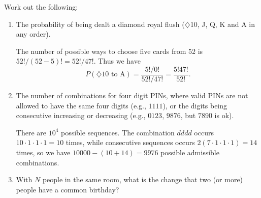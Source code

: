 \documentclass[letter-paper]{tufte-book}
\newenvironment{example}[1][Example]{\begin{trivlist}
\item[\hskip \labelsep {\bfseries #1}]}{\end{trivlist}}
\begin{document}
\begin{example}
  Work out the following:
  \begin{enumerate}
    \item The probability of being dealt a diamond royal flush
    ($\diamondsuit$10, J, Q, K and A in any order).
    
    The number of possible ways to choose five cards from 52 is
    $52!/(52-5)!=52!/47!$. Thus we have
    \begin{equation*}
      P(\diamondsuit\mbox{10 to A})=\frac{5!/0!}{52!/47!}=\frac{5!47!}{52!}.
    \end{equation*}
    
    \item The number of combinations for four digit PINs, where valid PINs are
    not allowed to have the same four digits (e.g., $1111$), or the digits being
    consecutive increasing or decreasing (e.g., $0123$, $9876$, but $7890$ is
    ok).
    
    There are $10^4$ possible sequences. The combination $dddd$ occurs $10\cdot
    1\cdot 1\cdot 1=10$ times, while consecutive sequences occurs $2(7\cdot
    1\cdot 1\cdot 1)=14$ times, so we have $10000-(10+14)=9976$ possible
    admissible combinations.
    
    \item With $N$ people in the same room, what is the change that two (or
    more) people have a common birthday?
    

\end{enumerate}
\end{example}
\end{document}
